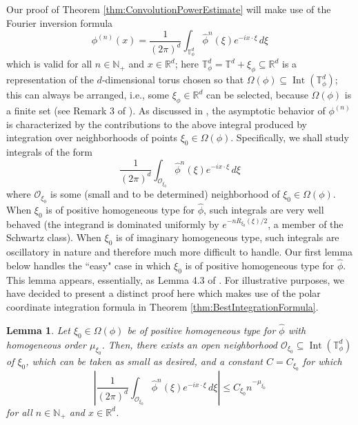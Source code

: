 \documentclass[11pt, letter]{book}
\newtheorem{lemma}[theorem]{Lemma}
\newcommand\Interior{\operatorname{Int}}
\begin{document}
\noindent Our proof of Theorem \ref{thm:ConvolutionPowerEstimate} will make use of the Fourier inversion formula
\begin{equation}\label{eq:FourierInversionConvolutionPower}
\phi^{(n)}(x)=\frac{1}{(2\pi)^d}\int_{\mathbb{T}_\phi^d}\widehat{\phi}^n(\xi)e^{-ix\cdot\xi}\,d\xi
\end{equation}
which is valid for all $n\in\mathbb{N}_+$ and $x\in\mathbb{R}^d$; here $\mathbb{T}_\phi^d=\mathbb{T}^d+\xi_\phi\subseteq\mathbb{R}^d$
is a representation of the $d$-dimensional torus chosen so that $\Omega(\phi)\subseteq \Interior(\mathbb{T}_{\phi}^d)$; this can always be arranged, i.e., some $\xi_\phi\in\mathbb{R}^d$ can be selected, because $\Omega(\phi)$ is a finite set (see Remark 3 of \cite{randles_convolution_2017}). As discussed in \cite{randles_convolution_2017}, the asymptotic behavior of $\phi^{(n)}$ is characterized by the contributions to the above integral produced by integration over neighborhoods of points $\xi_0\in\Omega(\phi).$ Specifically, we shall study integrals of the form
\begin{equation}\label{eq:LocalizedFourierInversionConvolutionPower}
\frac{1}{(2\pi)^d}\int_{\mathcal{O}_{\xi_0}}\widehat{\phi}^n(\xi)e^{-ix\cdot\xi}\,d\xi
\end{equation}
where $\mathcal{O}_{\xi_0}$ is some (small and to be determined) neighborhood of $\xi_0\in\Omega(\phi)$. When $\xi_0$ is of positive homogeneous type for $\widehat{\phi}$, such integrals are very well behaved (the integrand is dominated uniformly by $e^{-nR_{\xi_0}(\xi)/2}$, a member of the Schwartz class). When $\xi_0$ is of imaginary homogeneous type, such integrals are oscillatory in nature and therefore much more difficult to handle. Our first lemma below handles the ``easy" case in which $\xi_0$ is of positive homogeneous type for $\widehat{\phi}$. This lemma appears, essentially, as Lemma 4.3 of \cite{randles_convolution_2017}. For illustrative purposes, we have decided to present a distinct proof here which makes use of the polar coordinate integration formula in Theorem \ref{thm:BestIntegrationFormula}. 

\begin{framed}
\begin{lemma}\label{lem:EstPosHom}
Let $\xi_0\in\Omega(\phi)$ be of positive homogeneous type for $\widehat{\phi}$ with homogeneous order $\mu_{\xi_0}$. Then, there exists an open neighborhood $\mathcal{O}_{\xi_0}\subseteq\Interior(\mathbb{T}^d_\phi)$ of $\xi_0$, which can be taken as small as desired, and a constant $C=C_{\xi_0}$ for which
\begin{equation*}
    \left|\frac{1}{(2\pi)^d}\int_{\mathcal{O}_{\xi_0}}\widehat{\phi}^n(\xi)e^{-ix\cdot\xi}\,d\xi\right|\leq 
    C_{\xi_0} n^{-\mu_{\xi_0}}
\end{equation*}
for all $n\in\mathbb{N}_+$ and $x\in\mathbb{R}^d$.
\end{lemma}
\end{framed}
\end{document}
